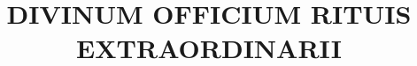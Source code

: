 \documentclass[11pt]{article}
\begin{document}
\title{DIVINUM OFFICIUM RITUIS EXTRAORDINARII}
\author{}
\date{}
\maketitle
\end{document}
